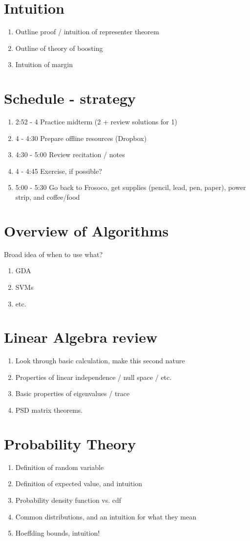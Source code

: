 \documentclass{article}
\begin{document}
\section{Intuition}
\begin{enumerate}
\item Outline proof / intuition of representer theorem
\item Outline of theory of boosting
\item Intuition of margin
\end{enumerate}

\section{Schedule - strategy}

\begin{enumerate}
  \item 2:52 - 4 Practice midterm (2 + review solutions for 1)
  \item 4 - 4:30 Prepare offline resources (Dropbox)
  \item 4:30 - 5:00 Review recitation / notes
  \item 4 - 4:45 Exercise, if possible?
  \item 5:00 - 5:30 Go back to Frosoco, get supplies (pencil, lead, pen, paper), power strip, and coffee/food
\end{enumerate}

\section{Overview of Algorithms}
Broad idea of when to use what?  
\begin{enumerate}
\item GDA
\item SVMs 
\item etc.
\end{enumerate}

\section{Linear Algebra review}
\begin{enumerate}
\item Look through basic calculation, make this second nature
\item Properties of linear independence / null space / etc.
\item Basic properties of eigenvalues / trace
\item PSD matrix theorems.
\end{enumerate}

\section{Probability Theory}
\begin{enumerate}
\item Definition of random variable
\item Definition of expected value, and intuition
\item Probability density function vs. cdf
\item Common distributions, and an intuition for what they mean
\item Hoeffding bounds, intuition!
\end{enumerate}
\end{document}
